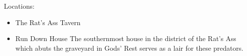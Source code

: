 \documentclass[11pt]{article}
\theoremstyle{definition}
\theoremstyle{remark}
\begin{document}
\begin{description}
\begin{description}
\end{description}

\item{Locations:}

\begin{itemize}

\item{The Rat's Ass Tavern}

\item{Run Down House} The southernmost house in the district of the Rat's Ass which abuts the graveyard in Gods' Rest serves as a lair for these predators.

\end{itemize}

\end{description}
\end{document}
